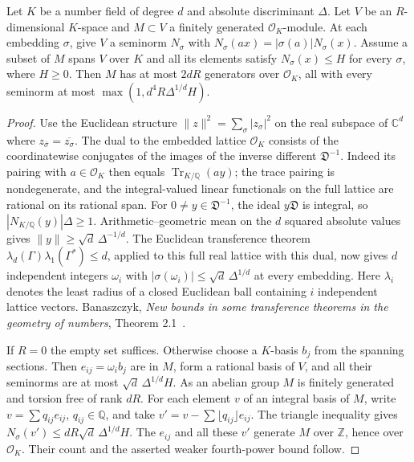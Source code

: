 \begin{lemma}\label{newtheta:short}
Let \(K\) be a number field of degree \(d\) and absolute
discriminant \(\Delta\). Let \(V\) be an \(R\)-dimensional \(K\)-space
and \(M\subset V\) a finitely generated \(\mathcal O_K\)-module.
At each embedding \(\sigma\), give \(V\) a seminorm \(N_\sigma\)
with \(N_\sigma(ax)=|\sigma(a)|N_\sigma(x)\).
Assume a subset of \(M\) spans \(V\) over \(K\) and all its elements
satisfy \(N_\sigma(x)\le H\) for every \(\sigma\), where \(H\ge0\).
Then \(M\) has at most \(2dR\) generators over \(\mathcal O_K\), all
with every seminorm at most \(\max(1,d^4R\Delta^{1/d}H)\).
\end{lemma}
\begin{proof}
Use the Euclidean structure
\(\|z\|^2=\sum_\sigma|z_\sigma|^2\) on the real subspace of
\(\mathbb C^d\) where \(z_{\bar\sigma}=\overline{z_\sigma}\).
The dual to the embedded lattice \(\mathcal O_K\) consists of the
coordinatewise conjugates of the images of the inverse different
\(\mathfrak D^{-1}\). Indeed its pairing with \(a\in\mathcal O_K\)
then equals \(\operatorname{Tr}_{K/\mathbb Q}(ay)\); the trace
pairing is nondegenerate, and the integral-valued linear functionals
on the full lattice are rational on its rational span.
For \(0\ne y\in\mathfrak D^{-1}\), the ideal \(y\mathfrak D\)
is integral, so \(|N_{K/\mathbb Q}(y)|\Delta\ge1\).
Arithmetic--geometric mean on the \(d\) squared absolute values gives
\(\|y\|\ge\sqrt d\,\Delta^{-1/d}\).
The Euclidean transference theorem
\(\lambda_d(\Gamma)\lambda_1(\Gamma^*)\le d\), applied to this
full real lattice with this dual, now gives \(d\) independent integers
\(\omega_i\) with \(|\sigma(\omega_i)|\le\sqrt d\,\Delta^{1/d}\)
at every embedding. Here \(\lambda_i\) denotes the least radius
of a closed Euclidean ball containing \(i\) independent lattice vectors.
Banaszczyk,
\emph{New bounds in some transference theorems in the geometry of numbers}, Theorem 2.1~\cite{banaszczyk}.

If \(R=0\) the empty set suffices. Otherwise choose a \(K\)-basis
\(b_j\) from the spanning sections. Then \(e_{ij}=\omega_i b_j\)
are in \(M\), form a rational basis of \(V\), and all their
seminorms are at most \(\sqrt d\,\Delta^{1/d}H\).
As an abelian group \(M\) is finitely generated and torsion free
of rank \(dR\). For each element \(v\) of an integral basis of \(M\),
write \(v=\sum q_{ij}e_{ij}\), \(q_{ij}\in\mathbb Q\), and take
\(v'=v-\sum\lfloor q_{ij}\rfloor e_{ij}\).
The triangle inequality gives
\(N_\sigma(v')\le dR\sqrt d\,\Delta^{1/d}H\).
The \(e_{ij}\) and all these \(v'\) generate \(M\) over \(\mathbb Z\),
hence over \(\mathcal O_K\). Their count and the asserted weaker
fourth-power bound follow.
\end{proof}

